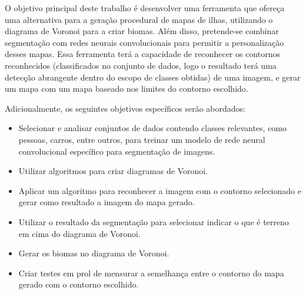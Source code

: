 O objetivo principal deste trabalho é desenvolver uma ferramenta que ofereça uma alternativa para a geração procedural de mapas de ilhas, utilizando o diagrama de Voronoi para a criar biomas. Além disso, pretende-se combinar segmentação com redes neurais convolucionais para permitir a personalização desses mapas. Essa ferramenta terá a capacidade de reconhecer os contornos reconhecidos (classificados no conjunto de dados, logo o resultado terá uma detecção abrangente dentro do escopo de classes obtidas) de uma imagem, e gerar um mapa com um mapa baseado nos limites do contorno escolhido.

Adicionalmente, os seguintes objetivos específicos serão abordados:

\begin{itemize}
	\item Selecionar e analisar conjuntos de dados contendo classes relevantes, como pessoas, carros, entre outros, para treinar um modelo de rede neural convolucional específico para segmentação de imagens.
	\item Utilizar algoritmos para criar diagramas de Voronoi.
	\item Aplicar um algoritmo para reconhecer a imagem com o contorno selecionado e gerar como resultado a imagem do mapa gerado.
	\item Utilizar o resultado da segmentação para selecionar indicar o que é terreno em cima do diagrama de Voronoi.
	\item Gerar os biomas no diagrama de Voronoi.
	\item Criar testes em prol de mensurar a semelhança entre o contorno do mapa gerado com o contorno escolhido.
\end{itemize}

